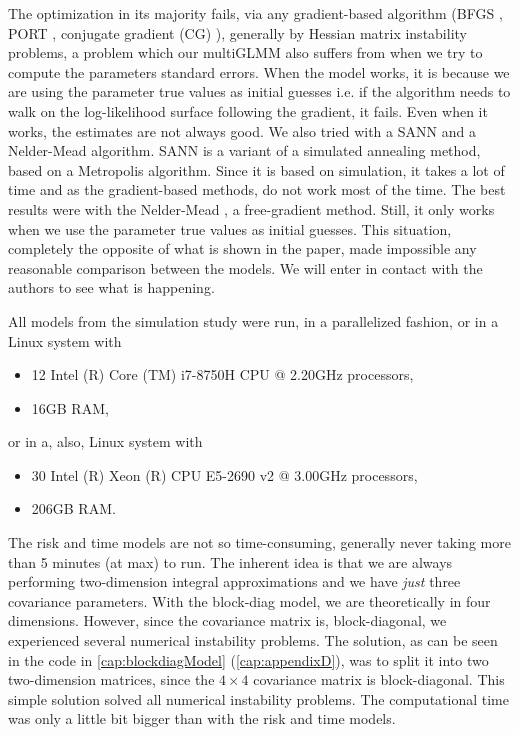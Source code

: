 The optimization in its majority fails, via any gradient-based algorithm
(BFGS \cite{nocedal&wright}, PORT \cite{PORTreport, PORTpaper},
conjugate gradient (CG) \cite{CG}), generally by Hessian matrix
instability problems, a problem which our multiGLMM also suffers from
when we try to compute the parameters standard errors. When the model
works, it is because we are using the parameter true values as initial
guesses i.e. if the algorithm needs to walk on the log-likelihood
surface following the gradient, it fails. Even when it works, the
estimates are not always good. We also tried with a SANN and a
Nelder-Mead algorithm. SANN \cite{SANN} is a variant of a simulated
annealing method, based on a Metropolis algorithm. Since it is based on
simulation, it takes a lot of time and as the gradient-based methods, do
not work most of the time. The best results were with the Nelder-Mead
\cite{neldermead}, a free-gradient method. Still, it only works when we
use the parameter true values as initial guesses. This situation,
completely the opposite of what is shown in the paper, made impossible
any reasonable comparison between the models. We will enter in contact
with the authors to see what is happening.

All models from the simulation study were run, in a parallelized
fashion, or in a Linux system with
\begin{itemize}
 \item 12 Intel (R) Core (TM) i7-8750H CPU @ 2.20GHz processors,
 \item 16GB RAM,
\end{itemize} 
or in a, also, Linux system with
\begin{itemize}
 \item 30 Intel (R) Xeon (R) CPU E5-2690 v2 @ 3.00GHz processors,
 \item 206GB RAM.
\end{itemize}

The risk and time models are not so time-consuming, generally never
taking more than 5 minutes (at max) to run. The inherent idea is that we
are always performing two-dimension integral approximations and we have
\textit{just} three covariance parameters. With the block-diag model, we
are theoretically in four dimensions. However, since the covariance
matrix is, block-diagonal, we experienced several numerical instability
problems. The solution, as can be seen in the code
in \autoref{cap:blockdiagModel} (\autoref{cap:appendixD}), was to split
it into two two-dimension matrices, since the \(4\times4\) covariance
matrix is block-diagonal. This simple solution solved all numerical
instability problems. The computational time was only a little bit
bigger than with the risk and time models. 

